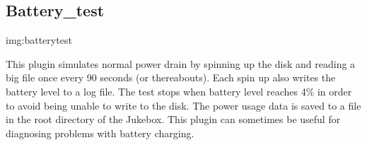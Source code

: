 \subsection{Battery\_test}
%
{img:batterytest}

This plugin simulates normal power drain by spinning up the disk and
reading a big file once every 90 seconds (or thereabouts). Each
spin up also writes the battery level to a
log file. The test stops when battery level reaches 4\% in order to
avoid being unable to write to the disk.  The power usage data is saved
to a file in the root directory of the Jukebox.  This plugin can
sometimes be useful for diagnosing problems with battery charging.

